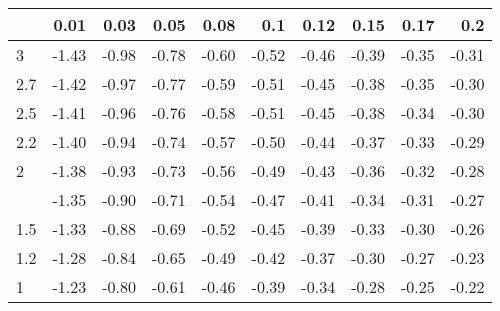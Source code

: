 
\begin{tabular}{lrrrrrrrrr}
\toprule
  & 0.01 & 0.03 & 0.05 & 0.08 & 0.1 & 0.12 & 0.15 & 0.17 & 0.2\\
\midrule
3 & -1.43 & -0.98 & -0.78 & -0.60 & -0.52 & -0.46 & -0.39 & -0.35 & -0.31\\
2.7 & -1.42 & -0.97 & -0.77 & -0.59 & -0.51 & -0.45 & -0.38 & -0.35 & -0.30\\
2.5 & -1.41 & -0.96 & -0.76 & -0.58 & -0.51 & -0.45 & -0.38 & -0.34 & -0.30\\
2.2 & -1.40 & -0.94 & -0.74 & -0.57 & -0.50 & -0.44 & -0.37 & -0.33 & -0.29\\
2 & -1.38 & -0.93 & -0.73 & -0.56 & -0.49 & -0.43 & -0.36 & -0.32 & -0.28\\
\addlinespace
1.7 & -1.35 & -0.90 & -0.71 & -0.54 & -0.47 & -0.41 & -0.34 & -0.31 & -0.27\\
1.5 & -1.33 & -0.88 & -0.69 & -0.52 & -0.45 & -0.39 & -0.33 & -0.30 & -0.26\\
1.2 & -1.28 & -0.84 & -0.65 & -0.49 & -0.42 & -0.37 & -0.30 & -0.27 & -0.23\\
1 & -1.23 & -0.80 & -0.61 & -0.46 & -0.39 & -0.34 & -0.28 & -0.25 & -0.22\\
\bottomrule
\end{tabular}
